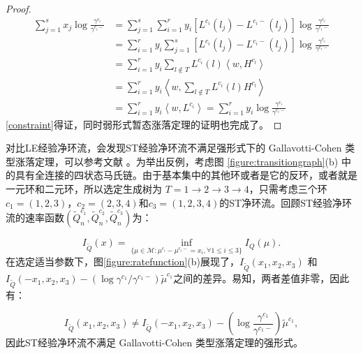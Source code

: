 \begin{proof}
\begin{equation*}
    \begin{aligned}
    \sum_{j=1}^{s} x_{j} \log \frac{\gamma^{c_{i}}}{\gamma^{c_{i}-}} &=\sum_{j=1}^{s} \sum_{i=1}^{r} y_{i}\left[L^{c_{i}}\left(l_{j}\right)-L^{c_{i}-}\left(l_{j}\right)\right] \log \frac{\gamma^{c_{i}}}{\gamma^{c_{i}-}} \\
    &=\sum_{i=1}^{r} y_{i} \sum_{j=1}^{s}\left[L^{c_{i}}\left(l_{j}\right)-L^{c_{i}-}\left(l_{j}\right)\right] \log \frac{\gamma^{c_{i}}}{\gamma^{c_{i}-}} \\
    &=\sum_{i=1}^{r} y_{i} \sum_{l \notin T} L^{c_{i}}(l)\left\langle w, H^{c_{l}}\right\rangle \\
    &=\sum_{i=1}^{r} y_{i}\left\langle w, \sum_{l \notin T} L^{c_{i}}(l) H^{c_{l}}\right\rangle \\
    &=\sum_{i=1}^{r} y_{i}\left\langle w, L^{c_{i}}\right\rangle=\sum_{i=1}^{r} y_{i} \log \frac{\gamma^{c_{i}}}{\gamma^{c_{i}-}}
    \end{aligned}
\end{equation*}
\ref{constraint}得证，同时弱形式暂态涨落定理的证明也完成了。

\end{proof}



对比LE经验净环流，会发现ST经验净环流不满足强形式下的 Gallavotti-Cohen 类型涨落定理，可以参考文献 \cite{mehl2012role,polettini2017effective,uhl2018fluctuations,kahlen2018hidden}。为举出反例，考虑图 \ref{figure:transitiongraph}(b) 中的具有全连接的四状态马氏链。由于基本集中的其他环或者是它的反环，或者就是一元环和二元环，所以选定生成树为 $T=1\to2\to3\to4$，只需考虑三个环$c_1=(1,2,3)$，$c_2=(2,3,4)$和$c_3=(1,2,3,4)$的ST净环流。回顾ST经验净环流的速率函数$(\tilde{Q}_n^{c_1}, \tilde{Q}_n^{c_2}, \tilde{Q}_n^{c_3})$为：

\begin{equation}
	I_{\tilde{Q}}(x)=\inf_{\{\mu\in\mathcal{M}:\mu^{c_i}-\mu^{c_i-}= x_i,\forall 1\le i\le 3\}}I_Q(\mu).
\end{equation}
在选定适当参数下，图\ref{figure:ratefunction}(b)展现了，$I_{\tilde{Q}}(x_1, x_2, x_3)$ 和 $ I_{\tilde{Q}}(-x_1, x_2, x_3) -\left(\log \gamma^{c_1} / \gamma^{c_1-}\right)\tilde{\mu}^{c_1}$之间的差异。易知，两者差值非零，因此有：

\begin{equation}
    I_{\tilde{Q}}(x_1, x_2, x_3) \neq I_{\tilde{Q}}(-x_1, x_2, x_3) -\left(\log\frac{\gamma^{c_1}}{\gamma^{c_1-}}\right)\tilde{\mu}^{c_1},
\end{equation}
因此ST经验净环流不满足 Gallavotti-Cohen 类型涨落定理的强形式。